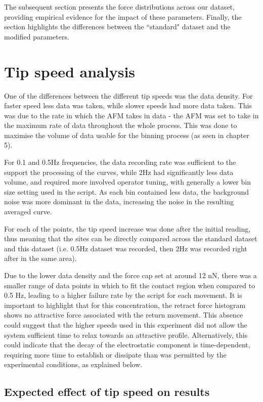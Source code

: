 The subsequent section presents the force distributions across our dataset, providing empirical evidence for the impact of these parameters. Finally, the section highlights the differences between the ``standard" dataset and the modified parameters.

\section{Tip speed analysis}

One of the differences between the different tip speeds was the data density. For faster speed less data was taken, while slower speeds had more data taken. This was due to the rate in which the AFM takes in data - the AFM was set to take in the maximum rate of data throughout the whole process. This was done to maximise the volume of data usable for the binning process (as seen in chapter 5). 

For 0.1 and 0.5Hz frequencies, the data recording rate was sufficient to the support the processing of the curves, while 2Hz had significantly less data volume, and required more involved operator tuning, with generally a lower bin size setting used in the script. As each bin contained less data, the background noise was more dominant in the data, increasing the noise in the resulting averaged curve. 

For each of the points, the tip speed increase was done after the initial reading, thus meaning that the sites can be directly compared across the standard dataset and this dataset (i.e. 0.5Hz dataset was recorded, then 2Hz was recorded right after in the same area).

Due to the lower data density and the force cap set at around 12 nN, there was a smaller range of data points in which to fit the contact region when compared to 0.5 Hz, leading to a higher failure rate by the script for each movement. It is important to highlight that for this concentration, the retract force histogram shows no attractive force associated with the return movement. This absence could suggest that the higher speeds used in this experiment did not allow the system sufficient time to relax towards an attractive profile. Alternatively, this could indicate that the decay of the electrostatic component is time-dependent, requiring more time to establish or dissipate than was permitted by the experimental conditions, as explained below.

\subsection{Expected effect of tip speed on results}

